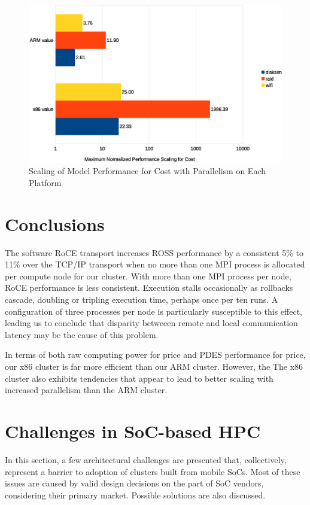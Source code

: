\documentclass[11pt]{book}
\begin{document}
\begin{figure}
\centering
\includegraphics[width=\textwidth]{costperf_summary}
\caption{Scaling of Model Performance for Cost with Parallelism on Each Platform}
\label{costperf-summary}
\end{figure}

\section{\textbf{Conclusions}}

The software RoCE transport increases ROSS performance by a consistent 5\% to
11\% over the TCP/IP transport when no more than one MPI process is allocated
per compute node for our cluster. With more than one MPI process per node, RoCE
performance is less consistent. Execution stalls occasionally as rollbacks
cascade, doubling or tripling execution time, perhaps once per ten runs. A
configuration of three processes per node is particularly susceptible to this
effect, leading us to conclude that disparity betweeen remote and local
communication latency may be the cause of this problem.

In terms of both raw computing power for price and PDES performance for price,
our x86 cluster is far more efficient than our ARM cluster. However, the The x86 cluster also
exhibits tendencies that appear to lead to better scaling with increased
parallelism than the ARM cluster.

\section{\textbf{Challenges in SoC-based HPC}}

In this section, a few architectural challenges are presented that,
collectively, represent a barrier to adoption of clusters built from mobile
SoCs. Most of these issues are caused by valid design decisions on the part of
SoC vendors, considering their primary market. Possible solutions are also
discussed.
\end{document}
